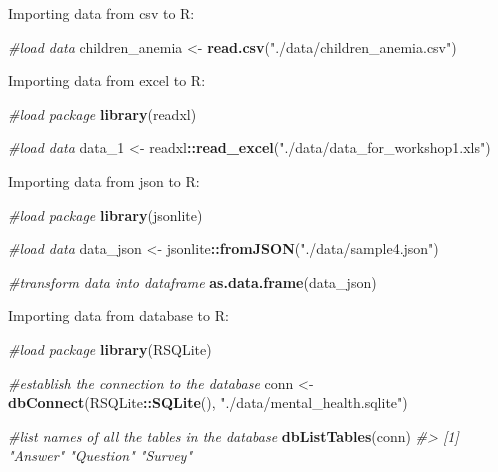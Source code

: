 \documentclass[
]{book}
\newenvironment{Shaded}{\begin{snugshade}}{\end{snugshade}}
\newcommand{\CommentTok}[1]{\textcolor[rgb]{0.56,0.35,0.01}{\textit{#1}}}
\newcommand{\FunctionTok}[1]{\textcolor[rgb]{0.13,0.29,0.53}{\textbf{#1}}}
\newcommand{\NormalTok}[1]{#1}
\newcommand{\OtherTok}[1]{\textcolor[rgb]{0.56,0.35,0.01}{#1}}
\newcommand{\SpecialCharTok}[1]{\textcolor[rgb]{0.81,0.36,0.00}{\textbf{#1}}}
\newcommand{\StringTok}[1]{\textcolor[rgb]{0.31,0.60,0.02}{#1}}
\begin{document}
Importing data from csv to R:

\begin{Shaded}
\begin{Highlighting}[]
\CommentTok{\#load data}
\NormalTok{children\_anemia }\OtherTok{\textless{}{-}} \FunctionTok{read.csv}\NormalTok{(}\StringTok{"./data/children\_anemia.csv"}\NormalTok{)}
\end{Highlighting}
\end{Shaded}

Importing data from excel to R:

\begin{Shaded}
\begin{Highlighting}[]
\CommentTok{\#load package}
\FunctionTok{library}\NormalTok{(readxl)}

\CommentTok{\#load data}
\NormalTok{data\_1 }\OtherTok{\textless{}{-}}\NormalTok{ readxl}\SpecialCharTok{::}\FunctionTok{read\_excel}\NormalTok{(}\StringTok{"./data/data\_for\_workshop1.xls"}\NormalTok{)}
\end{Highlighting}
\end{Shaded}

Importing data from json to R:

\begin{Shaded}
\begin{Highlighting}[]
\CommentTok{\#load package}
\FunctionTok{library}\NormalTok{(jsonlite)}

\CommentTok{\#load data}
\NormalTok{data\_json }\OtherTok{\textless{}{-}}\NormalTok{ jsonlite}\SpecialCharTok{::}\FunctionTok{fromJSON}\NormalTok{(}\StringTok{"./data/sample4.json"}\NormalTok{)}

\CommentTok{\#transform data into dataframe}
\FunctionTok{as.data.frame}\NormalTok{(data\_json)}
\end{Highlighting}
\end{Shaded}

Importing data from database to R:

\begin{Shaded}
\begin{Highlighting}[]
\CommentTok{\#load package}
\FunctionTok{library}\NormalTok{(RSQLite)}

\CommentTok{\#establish the connection to the database}
\NormalTok{conn }\OtherTok{\textless{}{-}} \FunctionTok{dbConnect}\NormalTok{(RSQLite}\SpecialCharTok{::}\FunctionTok{SQLite}\NormalTok{(), }\StringTok{"./data/mental\_health.sqlite"}\NormalTok{)}

\CommentTok{\#list names of all the tables in the database}
\FunctionTok{dbListTables}\NormalTok{(conn)}
\CommentTok{\#\textgreater{} [1] "Answer"   "Question" "Survey"}
\end{Highlighting}
\end{Shaded}
\end{document}
